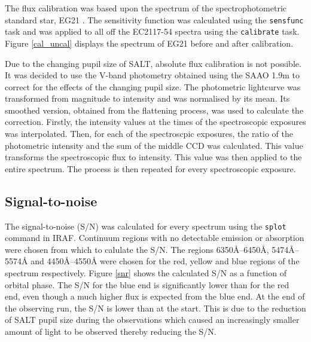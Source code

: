 The flux calibration was based upon the spectrum of the spectrophotometric standard star, EG21 \citep{1984MNRAS.206..241B}. The sensitivity function was calculated using the \texttt{sensfunc} task and was applied to all off the EC2117-54 spectra using the \texttt{calibrate} task. Figure \ref{cal_uncal} displays the spectrum of EG21 before and after calibration.

Due to the changing pupil size of SALT, absolute flux calibration is not possible. It was decided to use the V-band photometry obtained using the SAAO 1.9m to correct for the effects of the changing pupil size. The photometric lightcurve was transformed from magnitude to intensity and was normalised by its mean. Its smoothed version, obtained from the flattening process, was used to calculate the correction. Firstly, the intensity values at the times of the spectroscopic exposures was interpolated. Then, for each of the spectroscpic exposures, the ratio of the photometric intensity and the sum of the middle CCD was calculated. This value transforms the spectroscopic flux to intensity. This value was then applied to the entire spectrum. The process is then repeated for every spectroscopic exposure.


\subsection{Signal-to-noise}
\label{signaltonoise}
The signal-to-noise (S/N) was calculated for every spectrum using the \texttt{splot} command in IRAF. Continuum regions with no detectable emission or absorption were chosen from which to calulate the S/N. The regions 6350\AA--6450\AA, 5474\AA--5574\AA\hspace{2pt} and 4450\AA--4550\AA\hspace{2pt} were chosen for the red, yellow and blue regions of the spectrum respectively. Figure \ref{snr} shows the calculated S/N as a function of orbital phase. The S/N for the blue end is significantly lower than for the red end, even though a much higher flux is expected from the blue end. At the end of the observing run, the S/N is lower than at the start. This is due to the reduction of SALT pupil size during the observations which caused an increasingly smaller amount of light to be observed thereby reducing the S/N.

